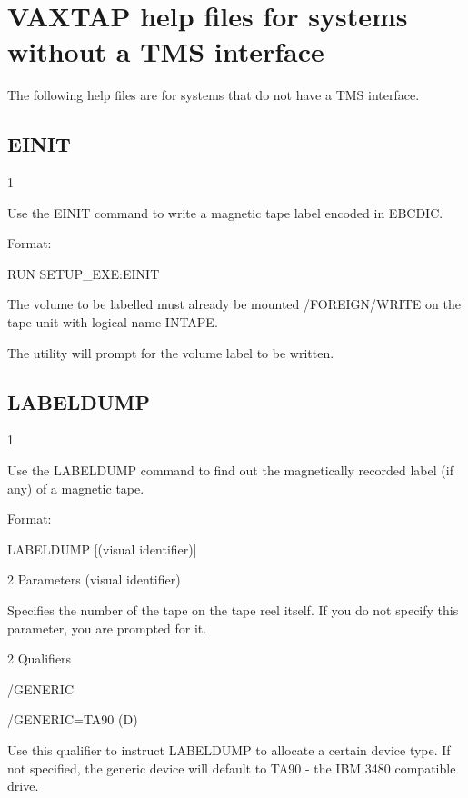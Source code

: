 \chapter{VAXTAP help files for systems without a TMS interface}
\par
The following help files are for systems that do not have a TMS
interface.
\begin{XMP}
\section{EINIT}
1 

  Use the EINIT command to write a magnetic tape label encoded in EBCDIC.

  Format:

  RUN SETUP_EXE:EINIT

  The volume to be labelled must already be mounted /FOREIGN/WRITE on
  the tape unit with logical name INTAPE.

  The utility will prompt for the volume label to be written.
\section{LABELDUMP}
1 


   Use the LABELDUMP command to find out the magnetically recorded label
   (if any) of a magnetic tape.

   Format:

   LABELDUMP [(visual identifier)]


2 Parameters
  (visual identifier)

  Specifies the number of the tape on the tape reel itself.
  If you do not specify this parameter, you are prompted for it.

2 Qualifiers

/GENERIC

   /GENERIC=TA90 (D)

 Use this qualifier to instruct LABELDUMP to allocate a certain
 device type. If not specified, the generic device will default to
 TA90 - the IBM 3480 compatible drive.


\end{XMP}
